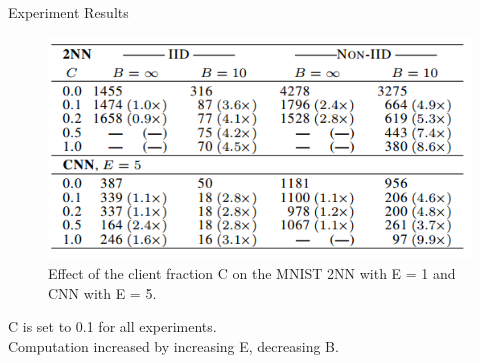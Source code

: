 \documentclass{beamer}
\begin{document}
\begin{frame}{Experiment Results}

	\begin{figure}[htbp]
		\centering
		\includegraphics[scale=0.7]{table1.png}
		\caption{Effect of the client fraction C on the MNIST 2NN
			with E = 1 and CNN with E = 5.}
	\end{figure}
	C is set to 0.1 for all experiments. \\
	Computation increased by increasing E, decreasing B.
\end{frame}
\end{document}
